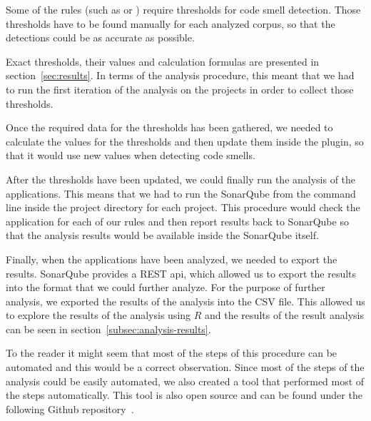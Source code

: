 Some of the rules (such as  or ) require thresholds for code smell detection.
Those thresholds have to be found manually for each analyzed corpus, so that the detections could be as accurate
as possible.


Exact thresholds, their values and calculation formulas are presented in section~\ref{sec:results}.
In terms of the analysis procedure, this meant that we had to run the first iteration of the analysis
on the projects in order to collect those thresholds.

Once the required data for the thresholds has been gathered, we needed to calculate the values
for the thresholds and then update them inside the plugin, so that it would use new values
when detecting code smells.

After the thresholds have been updated, we could finally run the analysis of the applications.
This means that we had to run the SonarQube from the command line inside the project directory for each project.
This procedure would check the application for each of our rules and then report results back to SonarQube so that
the analysis results would be available inside the SonarQube itself.

Finally, when the applications have been analyzed, we needed to export the results.
SonarQube provides a REST api, which allowed us to export the results into the format that
we could further analyze.
For the purpose of further analysis, we exported the results of the analysis into the CSV file.
This allowed us to explore the results of the analysis using $R$ and the results of the result analysis
can be seen in section~\ref{subsec:analysis-results}.

To the reader it might seem that most of the steps of this procedure can be automated and this would be a correct
observation.
Since most of the steps of the analysis could be easily automated, we also created a tool that performed
most of the steps automatically.
This tool is also open source and can be found under the following Github repository~\cite{bulk_analyzer}.

